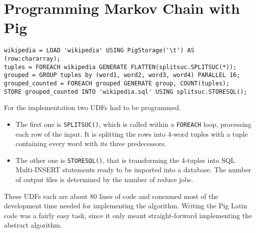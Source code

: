 \section{Programming Markov Chain with Pig}                                              
                         
\begin{lstlisting}[language=pig,caption=Markov Chain in Pig Latin,label=pigmarkovstructure,columns=fullflexible]    
wikipedia = LOAD 'wikipedia' USING PigStorage('\t') AS (row:chararray);
tuples = FOREACH wikipedia GENERATE FLATTEN(splitsuc.SPLITSUC(*));
grouped = GROUP tuples by (word1, word2, word3, word4) PARALLEL 16;
grouped_counted = FOREACH grouped GENERATE group, COUNT(tuples);
STORE grouped_counted INTO 'wikipedia.sql' USING splitsuc.STORESQL();
\end{lstlisting}                  

For the implementation two UDFs had to be programmed. 
\begin{itemize}
\item The first one is {\tt SPLITSUC()}, which is called within a {\tt FOREACH} loop, processing each row of the input. It is splitting the rows into 4-word tuples with a tuple containing every word with its three predecessors.
\item The other one is {\tt STORESQL()}, that is transforming the 4-tuples into SQL Multi-INSERT statements ready to be imported into a database. The number of output files is determined by the number of reduce jobs.
\end{itemize}

These UDFs each are about 80 lines of code and consumed most of the development time needed for implementing the algorithm. Writing the Pig Latin code was a fairly easy task, since it only meant straight-forward implementing the abstract algorithm.



